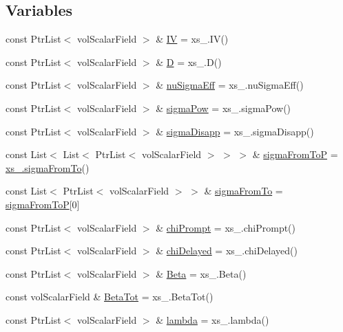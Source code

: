 \subsection*{Variables}
\begin{DoxyCompactItemize}
\item 
const Ptr\+List$<$ vol\+Scalar\+Field $>$ \& \hyperlink{setXSFields_8H_ab9a5192c8e8349e3031f4f584230968f}{IV} = xs\+\_\+.\+IV()
\item 
const Ptr\+List$<$ vol\+Scalar\+Field $>$ \& \hyperlink{setXSFields_8H_a70ac93a527a85b4edf386830643d1561}{D} = xs\+\_\+.\+D()
\item 
const Ptr\+List$<$ vol\+Scalar\+Field $>$ \& \hyperlink{setXSFields_8H_aa603f5e77d24550aec5d6843a62d3707}{nu\+Sigma\+Eff} = xs\+\_\+.\+nu\+Sigma\+Eff()
\item 
const Ptr\+List$<$ vol\+Scalar\+Field $>$ \& \hyperlink{setXSFields_8H_ac04a1be049ae486d7c60fa591093c834}{sigma\+Pow} = xs\+\_\+.\+sigma\+Pow()
\item 
const Ptr\+List$<$ vol\+Scalar\+Field $>$ \& \hyperlink{setXSFields_8H_a26e2cc0a2f240dbf0b8888db0c8869e2}{sigma\+Disapp} = xs\+\_\+.\+sigma\+Disapp()
\item 
const List$<$ List$<$ Ptr\+List$<$ vol\+Scalar\+Field $>$ $>$ $>$ \& \hyperlink{setXSFields_8H_a67e262e215bebd61694a35e533ab6495}{sigma\+From\+ToP} = \hyperlink{setXSFields_8H_a5cbb3e3ec5e74f9ccd323dc231c96525}{xs\+\_\+.\+sigma\+From\+To}()
\item 
const List$<$ Ptr\+List$<$ vol\+Scalar\+Field $>$ $>$ \& \hyperlink{setXSFields_8H_a5cbb3e3ec5e74f9ccd323dc231c96525}{sigma\+From\+To} = \hyperlink{setXSFields_8H_a67e262e215bebd61694a35e533ab6495}{sigma\+From\+ToP}\mbox{[}0\mbox{]}
\item 
const Ptr\+List$<$ vol\+Scalar\+Field $>$ \& \hyperlink{setXSFields_8H_ae99cb941c26b8d02c30336ffe9d73cd2}{chi\+Prompt} = xs\+\_\+.\+chi\+Prompt()
\item 
const Ptr\+List$<$ vol\+Scalar\+Field $>$ \& \hyperlink{setXSFields_8H_a40cc7f7cbcb1b9e71096e95b125537c2}{chi\+Delayed} = xs\+\_\+.\+chi\+Delayed()
\item 
const Ptr\+List$<$ vol\+Scalar\+Field $>$ \& \hyperlink{setXSFields_8H_af87588a82c92b5a98302618c01213792}{Beta} = xs\+\_\+.\+Beta()
\item 
const vol\+Scalar\+Field \& \hyperlink{setXSFields_8H_a3ad4facb2dd0406d605dcb63190ce6f1}{Beta\+Tot} = xs\+\_\+.\+Beta\+Tot()
\item 
const Ptr\+List$<$ vol\+Scalar\+Field $>$ \& \hyperlink{setXSFields_8H_a5947916d2a53602ab94837afe65c23dd}{lambda} = xs\+\_\+.\+lambda()

\end{DoxyCompactItemize}
